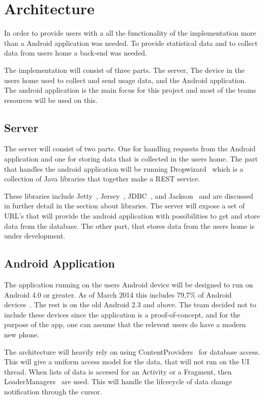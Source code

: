 \section{Architecture}
In order to provide users with a all the functionality of the implementation more than a Android application was needed.
To provide statistical data and to collect data from users home a back-end was needed.

The implementation will consist of three parts. The server, The device in the users home used to 
collect and send usage data, and the Android application. The android application is the main focus for 
this project and most of the teams resources will be used on this.

\subsection{Server}
The server will consist of two parts. One for handling requests from the Android application and one for storing data that is collected in the users home. 
The part that handles the android application will be running Dropwizard~\cite{dropwizard} which is a collection of Java libraries that together make a REST service. 

These libraries include Jetty~\cite{jetty}, Jersey~\cite{jersey}, JDBC~\cite{jdbc}, and Jackson~\cite{jackson} and are discussed in further detail in the section about libraries.
The server will expose a set of URL’s that will provide the android application with 
possibilities to get and store data from the database. The other part, that stores data from the users home is under development.

\subsection{Android Application}
The application running on the users Android device will be designed to run on Android 4.0 or greater. As of March 2014 this includes 79,7\% of Android devices~\cite{androidDeviceFragmentation}. The rest is on the old Android 2.3 and above. The team decided not to include these devices since the application is a proof-of-concept, and for the purpose of the app, one can assume that the relevent users do have a modern new phone. 

The architecture will heavily rely on using ContentProviders~\cite{contentproviders} for database access. This will give a uniform access model for the data, that will not run on the UI thread. When lists of data is accesed for an Activity or a Fragment, then LoaderManagers~\cite{loadermanager} are used. This will handle the lifcecycle of data change notification through the cursor. 

